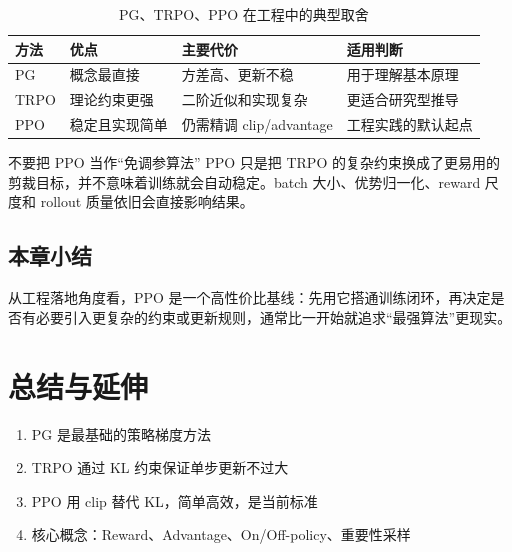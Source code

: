 \documentclass[a4paper]{article}
\begin{document}
\begin{table}[H]
\centering
\begin{tabular}{p{2.6cm}p{3.5cm}p{3.7cm}p{3.2cm}}
\toprule
方法 & 优点 & 主要代价 & 适用判断 \\
\midrule
PG & 概念最直接 & 方差高、更新不稳 & 用于理解基本原理 \\
TRPO & 理论约束更强 & 二阶近似和实现复杂 & 更适合研究型推导 \\
PPO & 稳定且实现简单 & 仍需精调 clip/advantage & 工程实践的默认起点 \\
\bottomrule
\end{tabular}
\caption{PG、TRPO、PPO 在工程中的典型取舍}
\end{table}

\begin{warningbox}{不要把 PPO 当作“免调参算法”}
PPO 只是把 TRPO 的复杂约束换成了更易用的剪裁目标，并不意味着训练就会自动稳定。batch 大小、优势归一化、reward 尺度和 rollout 质量依旧会直接影响结果。
\end{warningbox}

\subsection{本章小结}
从工程落地角度看，PPO 是一个高性价比基线：先用它搭通训练闭环，再决定是否有必要引入更复杂的约束或更新规则，通常比一开始就追求“最强算法”更现实。

\newpage
\section{总结与延伸}
\begin{enumerate}
  \item PG 是最基础的策略梯度方法
  \item TRPO 通过 KL 约束保证单步更新不过大
  \item PPO 用 clip 替代 KL，简单高效，是当前标准
  \item 核心概念：Reward、Advantage、On/Off-policy、重要性采样
\end{enumerate}
\end{document}
